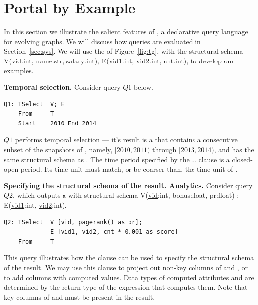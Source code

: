 \section{Portal by Example}
\label{sec:example}

In this section we illustrate the salient features of \ql, a
declarative query language for evolving graphs.  We will discuss how
\ql queries are evaluated in Section~\ref{sec:sys}.  We will use the
\tg {} of Figure~\ref{fig:tg}, with the structural schema
V(\underline{vid}:int, name:str, salary:int); E(\underline{vid1}:int,
\underline{vid2}:int, cnt:int), to develop our examples.

{\bf Temporal selection.}  Consider query $Q1$ below.  


\begin{verbatim}
Q1: TSelect  V; E
    From     T
    Start    2010 End 2014
\end{verbatim}

$Q1$ performs temporal selection --- it's result is a \tg that
contains a consecutive subset of the snapshots of , namely,
$[2010, 2011)$ through $[2013, 2014)$, and has the same structural
    schema as .  The time period specified by the
     \ldots {} clause is a closed-open period.
    Its time unit must match, or be coarser than, the time unit of
    . 

{\bf Specifying the structural schema of the result.  Analytics.}
Consider query $Q2$, which outputs a \tg with structural schema
V(\underline{vid}:int, bonus:float, pr:float) ;
E(\underline{vid1}:int, \underline{vid2}:int).

\begin{verbatim}
Q2: TSelect  V [vid, pagerank() as pr]; 
             E [vid1, vid2, cnt * 0.001 as score]
    From     T
\end{verbatim}

This query illustrates how the  clause can be used to
specify the structural schema of the result.  We may use this clause
to project out non-key columns of  and , or to add
columns with computed values.  Data types of computed attributes
 and  are determined by the return type of the
expression that computes them.  Note that key columns of  and
 must be present in the result.

